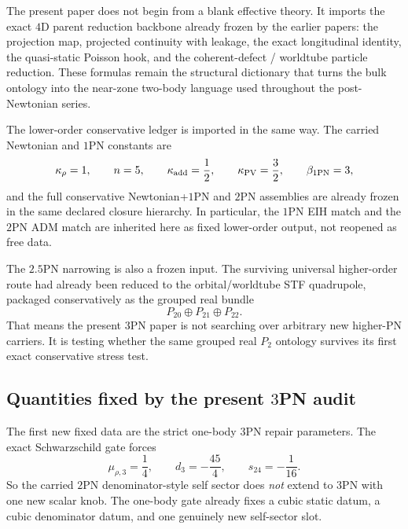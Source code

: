 \documentclass[11pt]{article}
\begin{document}
The present paper does not begin from a blank effective theory.  It imports the
exact $4$D parent reduction backbone already frozen by the earlier papers: the
projection map, projected continuity with leakage, the exact longitudinal
identity, the quasi-static Poisson hook, and the coherent-defect / worldtube
particle reduction.  These formulas remain the structural dictionary that turns
the bulk ontology into the near-zone two-body language used throughout the
post-Newtonian series.

The lower-order conservative ledger is imported in the same way.  The carried
Newtonian and $1$PN constants are
\begin{equation}
\kappa_\rho=1,
\qquad
n=5,
\qquad
\kappa_{\rm add}=\frac12,
\qquad
\kappa_{\rm PV}=\frac32,
\qquad
\beta_{\rm 1PN}=3,
\label{eq:fixed-open-lower-order-ledger}
\end{equation}
and the full conservative Newtonian+$1$PN and $2$PN assemblies are already
frozen in the same declared closure hierarchy.  In particular, the $1$PN EIH
match and the $2$PN ADM match are inherited here as fixed lower-order output,
not reopened as free data.

The $2.5$PN narrowing is also a frozen input.  The surviving universal
higher-order route had already been reduced to the orbital/worldtube STF
quadrupole, packaged conservatively as the grouped real bundle
\begin{equation}
P_{20}\oplus P_{21}\oplus P_{22}.
\label{eq:fixed-open-grouped-bundle}
\end{equation}
That means the present $3$PN paper is not searching over arbitrary new higher-PN
carriers.  It is testing whether the same grouped real $P_2$ ontology survives
its first exact conservative stress test.

\subsection{Quantities fixed by the present \texorpdfstring{$3$}{3}PN audit}
\label{sec:fixed-open-fixed}

The first new fixed data are the strict one-body $3$PN repair parameters.  The
exact Schwarzschild gate forces
\begin{equation}
\mu_{\rho,3}=\frac14,
\qquad
 d_3=-\frac{45}{4},
\qquad
 s_{24}=-\frac1{16}.
\label{eq:fixed-open-onebody-ledger}
\end{equation}
So the carried $2$PN denominator-style self sector does \emph{not} extend to
$3$PN with one new scalar knob.  The one-body gate already fixes a cubic static
datum, a cubic denominator datum, and one genuinely new self-sector slot.
\end{document}
